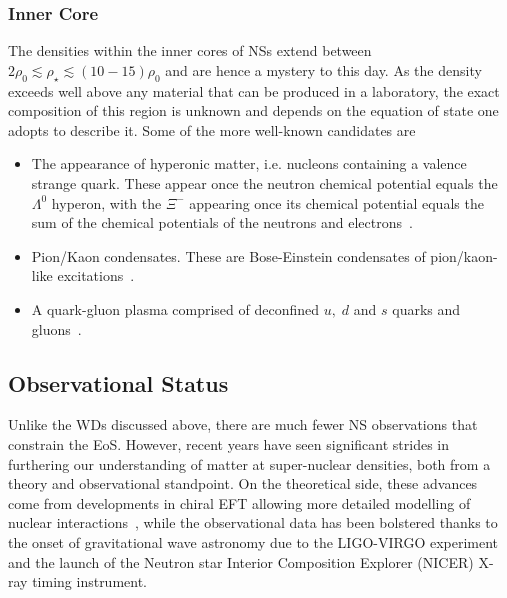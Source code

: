\subsubsection*{Inner Core}
The densities within the inner cores of NSs extend between $2\rho_0 \lesssim \rho_\star \lesssim (10-15)\rho_0$ and are hence a mystery to this day. As the density exceeds well above any material that can be produced in a laboratory, the exact composition of this region is unknown and depends on the equation of state one adopts to describe it. Some of the more well-known candidates are
\begin{itemize}
    \item The appearance of hyperonic matter, i.e. nucleons containing a valence strange quark. These appear once the neutron chemical potential equals the $\Lambda^0$ hyperon, with the $\Xi^-$ appearing once its chemical potential equals the sum of the chemical potentials of the neutrons and electrons~\cite{Weber:2007ch_may_NeutronStarInteriors,Fortin:2014mya_Neutronstarshyperon}. 
    \item Pion/Kaon condensates. These are Bose-Einstein condensates of pion/kaon-like excitations~\cite{Baym:1973zk_Pioncondensationnuclear,Baym:1974vzp_Pioncondensationneutron,Kaplan:1986yq_StrangeGoingsDense, Ellis:1995kz_Kaoncondensationneutron, Brown:1992ib_Novelmechanismkaon, Ma:2022fmu_jan_Kaonmesoncondensate}. 
    \item A quark-gluon plasma comprised of deconfined $u,\; d$ and $s$ quarks and gluons~\cite{Akmal:1998cf_Equationstatenucleon,Baym:2006rq_Neutronstarsquark,Baym:2017whm_Hadronsquarksneutron}.
\end{itemize}


\subsection{Observational Status}

Unlike the WDs discussed above, there are much fewer NS observations that constrain the EoS. However, recent years have seen significant strides in furthering our understanding of matter at super-nuclear densities, both from a theory and observational standpoint. On the theoretical side, these advances come from developments in chiral EFT allowing more detailed modelling of nuclear interactions~\cite{Hebeler:2009iv_Chiralthreenucleonforces, Tews:2012fj_jan_NeutronMatterNexttoNexttoNexttoLeading, Tews:2018kmu_jun_Constrainingspeedsound}, while the observational data has been bolstered thanks to the onset of gravitational wave astronomy due to the LIGO-VIRGO experiment~\cite{LIGOScientific:2017zic_Gravitationalwavesgammarays, LIGOScientific:2018cki_oct_GW170817MeasurementsNeutron, LIGOScientific:2018hze_Propertiesbinaryneutron} and the launch of the Neutron star Interior Composition Explorer (NICER) X-ray timing instrument. 


